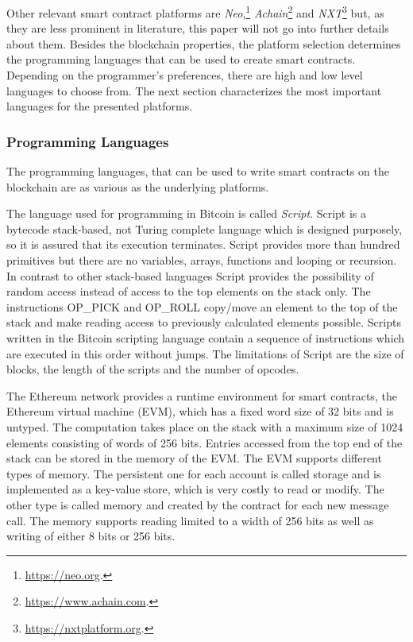 \documentclass[conference]{IEEEtran}
\begin{document}
Other relevant smart contract platforms are \textit{Neo},\footnote{\url{https://neo.org}.} \textit{Achain}\footnote{\url{https://www.achain.com}.} and \textit{NXT}\footnote{\url{https://nxtplatform.org}.} but, as they are less prominent in literature, this paper will not go into further details about them.  
Besides the blockchain properties, the platform selection determines the programming languages that can be used to create smart contracts. Depending on the programmer's preferences, there are high and low level languages to choose from. The next section characterizes the most important languages for the presented platforms.
\subsubsection{Programming Languages}
The programming languages, that can be used to write smart contracts on the blockchain are as various as the underlying platforms. \par 
The language used for programming in Bitcoin is called \textit{Script}. Script is a bytecode stack-based, not Turing complete language which is designed purposely, so it is assured that its execution terminates. Script provides more than hundred primitives but there are no variables, arrays, functions and looping or recursion. In contrast to other stack-based languages Script provides the possibility of random access instead of access to the top elements on the stack only. The instructions OP\_PICK and OP\_ROLL copy/move an element to the top of the stack and make reading access to previously calculated elements possible. Scripts written in the Bitcoin scripting language contain a sequence of instructions which are executed in this order without jumps. The limitations of Script are the size of blocks, the length of the scripts and the number of opcodes. \cite{McAdams2017} \par 
The Ethereum network provides a runtime environment for smart contracts, the Ethereum virtual machine (EVM), which has a fixed word size of 32 bits and is untyped. The computation takes place on the stack with a maximum size of 1024 elements consisting of words of 256 bits. Entries accessed from the top end of the stack can be stored in the memory of the EVM. The EVM supports different types of memory. The persistent one for each account is called storage and is implemented as a key-value store, which is very costly to read or modify. The other type is called memory and created by the contract for each new message call. The memory supports reading limited to a width of 256 bits as well as writing of either 8 bits or 256 bits. \cite{Solidity2017} \par 
\end{document}
